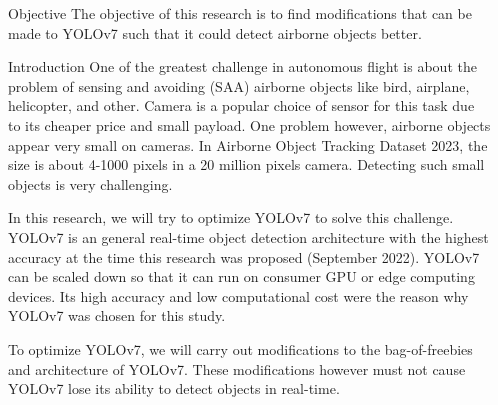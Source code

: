 \documentclass[final,hyperref={pdfpagelabels=false}]{beamer}
\begin{document}
\begin{frame}[t]
\begin{columns}[t] %

\begin{column}{.02\textwidth}\end{column} %

\begin{column}{.465\textwidth} %


\begin{block}{Objective}
  The objective of this research is to find modifications that can be made to YOLOv7
  such that it could detect airborne objects better.
\end{block}

            
\begin{block}{Introduction}
  One of the greatest challenge in autonomous flight
  is about the problem of sensing and avoiding (SAA) airborne objects like bird, airplane, helicopter, and other.
  Camera is a popular choice of sensor for this task due to its cheaper price and small payload.
  One problem however, airborne objects appear very small on cameras.
  In Airborne Object Tracking Dataset 2023, the size is about 4-1000 pixels in a 20 million pixels camera.
  Detecting such small objects is very challenging.

  In this research, we will try to optimize YOLOv7 to solve this challenge.
  YOLOv7 is an general real-time object detection architecture with the highest accuracy at the time this research was proposed (September 2022).
  YOLOv7 can be scaled down so that it can run on consumer GPU or edge computing devices.
  Its high accuracy and low computational cost were the reason why YOLOv7 was chosen for this study.

  To optimize YOLOv7, we will carry out modifications to the bag-of-freebies and architecture of YOLOv7.
  These modifications however must not cause YOLOv7 lose its ability to detect objects in real-time.
\end{block}


\end{column}
\end{columns}
\end{frame}
\end{document}
